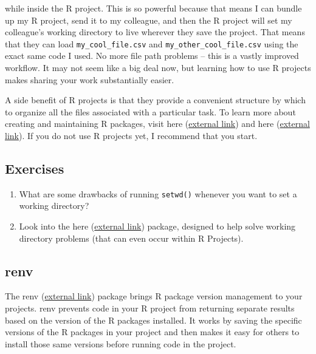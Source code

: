 \documentclass[
]{book}
\begin{document}
while inside the R project. This is so powerful because that means I can bundle up my R project, send it to my colleague, and then the R project will set my colleague's working directory to live wherever they save the project. That means that they can load \texttt{my\_cool\_file.csv} and \texttt{my\_other\_cool\_file.csv} using the exact same code I used. No more file path problems -- this is a vastly improved workflow. It may not seem like a big deal now, but learning how to use R projects makes sharing your work substantially easier.

A side benefit of R projects is that they provide a convenient structure by which to organize all the files associated with a particular task. To learn more about creating and maintaining R packages, visit here (\href{https://r4ds.had.co.nz/workflow-projects.html}{external link}) and here (\href{https://support.rstudio.com/hc/en-us/articles/200526207-Using-Projects}{external link}). If you do not use R projects yet, I recommend that you start.

\hypertarget{ex-set11}{%
\subsection{Exercises}\label{ex-set11}}

\begin{enumerate}
\def\labelenumi{\arabic{enumi}.}
\item
  What are some drawbacks of running \texttt{setwd()} whenever you want to set a working directory?
\item
  Look into the here (\href{https://here.r-lib.org/}{external link}) package, designed to help solve working directory problems (that can even occur within R Projects).
\end{enumerate}

\hypertarget{renv}{%
\subsection{renv}\label{renv}}

The renv (\href{https://rstudio.github.io/renv/articles/renv.html}{external link}) package brings R package version management to your projects. renv prevents code in your R project from returning separate results based on the version of the R packages installed. It works by saving the specific versions of the R packages in your project and then makes it easy for others to install those same versions before running code in the project.
\end{document}
